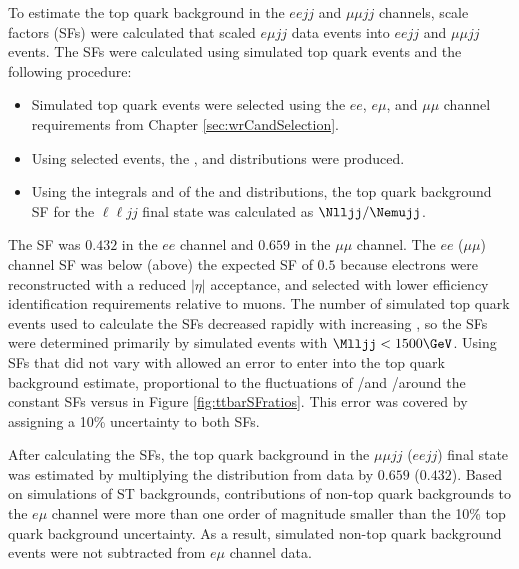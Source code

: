 To estimate the top quark background in the $eejj$ and $\mu\mu jj$ channels, scale factors (SFs) were 
calculated that scaled $e\mu jj$ data events into $eejj$ and $\mu\mu jj$ events.  The SFs were calculated using 
simulated top quark events and the following procedure:

\begin{itemize}
	\item Simulated top quark events were selected using the $ee$, $e\mu$, and $\mu\mu$ channel requirements from 
		Chapter \ref{sec:wrCandSelection}.
	\item Using selected events, the \Meejj, \Memujj and \Mmumujj distributions were produced.
	\item Using the integrals \Nemujj and \Nlljj of the \Memujj and \Mlljj distributions, the top quark background SF 
		for the $\ell\ell jj$ final state was calculated as $\Nlljj / \Nemujj$.
\end{itemize}

The SF was $0.432$ in the $ee$ channel and $0.659$ in the $\mu\mu$ channel.  The $ee$ ($\mu\mu$) channel SF 
was below (above) the expected SF of $0.5$ because electrons were reconstructed with a reduced $|\eta|$ acceptance,
and selected with lower efficiency identification requirements relative to muons.  The number of simulated top quark 
events used to calculate the SFs decreased rapidly with increasing \Mlljj, so the SFs were determined primarily by 
simulated events with $\Mlljj < 1500\GeV$.  Using SFs that did not vary with \Mlljj allowed an error to enter into the 
top quark background estimate, proportional to the fluctuations of \Mmumujj/\Memujj and \Meejj/\Memujj around the 
constant SFs versus \Mlljj in Figure \ref{fig:ttbarSFratios}.  This error was covered by assigning a 10\% uncertainty 
to both SFs.

After calculating the SFs, the top quark background in the $\mu\mu jj$ ($eejj$) final state was estimated by 
multiplying the \Memujj distribution from data by $0.659$ ($0.432$).  Based on simulations of ST backgrounds, contributions 
of non-top quark backgrounds to the $e\mu$ channel were more than one order of magnitude smaller than the 10\% top quark 
background uncertainty.  As a result, simulated non-top quark background events were not subtracted from $e\mu$ channel 
data.

